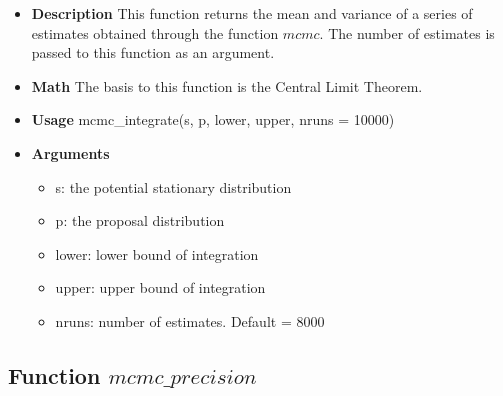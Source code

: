 \documentclass{article}
\begin{document}
\begin{itemize}
    \item \textbf{Description}\newline
    This function returns the mean and variance of a series of estimates obtained through the function $mcmc$. The number of estimates is passed to this function as an argument.
    
    \item \textbf{Math}\newline
    The basis to this function is the Central Limit Theorem.
    
    \item \textbf{Usage}\newline
    mcmc\_integrate(s, p, lower, upper, nruns = 10000)
    
    \item \textbf{Arguments}
    
    \begin{itemize}
        \item s: the potential stationary distribution 
        \item p: the proposal distribution
        \item lower: lower bound of integration
        \item upper: upper bound of integration
        \item nruns: number of estimates. Default = 8000
    \end{itemize}
\end{itemize}

\subsection{Function $mcmc\_precision$}
\end{document}
